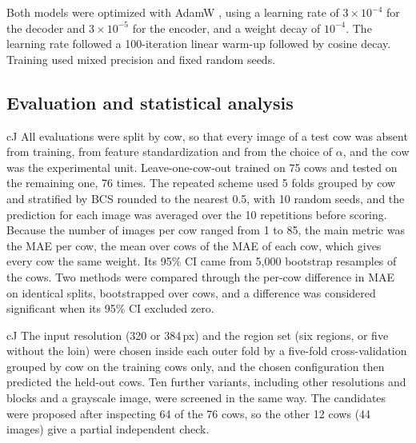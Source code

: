 Both models were optimized with AdamW \citep{loshchilov2019adamw}, using a learning rate of $3\times10^{-4}$ for the decoder and $3\times10^{-5}$ for the encoder, and a weight decay of $10^{-4}$.
The learning rate followed a 100-iteration linear warm-up followed by cosine decay.
Training used mixed precision and fixed random seeds.

\subsection{Evaluation and statistical analysis}
\label{sec:evaluation}\label{sec:selection}\label{sec:analyses}\label{sec:baselines}

\begin{marca}{cJ}
All evaluations were split by cow, so that every image of a test cow was absent from training, from feature standardization and from the choice of $\alpha$, and the cow was the experimental unit.
Leave-one-cow-out trained on 75 cows and tested on the remaining one, 76 times.
The repeated scheme used 5 folds grouped by cow and stratified by BCS rounded to the nearest 0.5, with 10 random seeds, and the prediction for each image was averaged over the 10 repetitions before scoring.
Because the number of images per cow ranged from 1 to 85, the main metric was the MAE per cow, the mean over cows of the MAE of each cow, which gives every cow the same weight.
Its 95\% CI came from 5,000 bootstrap resamples of the cows.
Two methods were compared through the per-cow difference in MAE on identical splits, bootstrapped over cows, and a difference was considered significant when its 95\% CI excluded zero.
\end{marca}

\begin{marca}{cJ}
The input resolution (320 or 384\,px) and the region set (six regions, or five without the loin) were chosen inside each outer fold by a five-fold cross-validation grouped by cow on the training cows only, and the chosen configuration then predicted the held-out cows.
Ten further variants, including other resolutions and blocks and a grayscale image, were screened in the same way.
The candidates were proposed after inspecting 64 of the 76 cows, so the other 12 cows (44 images) give a partial independent check.
\end{marca}

